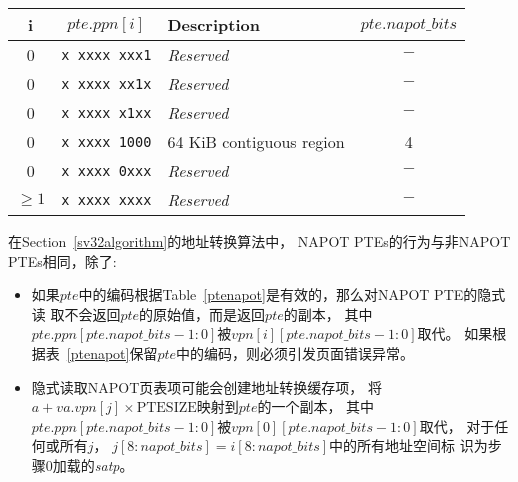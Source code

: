 \begin{table*}[h!]
\begin{center}
\begin{tabular}{|c|c||l|c|}
\hline
i        & $pte.ppn[i]$      & Description              & $pte.napot\_bits$ \\
\hline
0        & {\tt x~xxxx~xxx1} & {\em Reserved}           & $-$ \\
0        & {\tt x~xxxx~xx1x} & {\em Reserved}           & $-$ \\
0        & {\tt x~xxxx~x1xx} & {\em Reserved}           & $-$ \\
0        & {\tt x~xxxx~1000} & 64 KiB contiguous region & 4   \\
0        & {\tt x~xxxx~0xxx} & {\em Reserved}           & $-$ \\
$\geq 1$ & {\tt x~xxxx~xxxx} & {\em Reserved}           & $-$ \\
\hline
\end{tabular}
\end{center}
\caption{Page table entry encodings when $pte$.N=1}
\label{ptenapot}
\end{table*}

在Section~\ref{sv32algorithm}的地址转换算法中，
NAPOT PTEs的行为与非NAPOT PTEs相同，除了:
\begin{itemize}
  \item 如果$pte$中的编码根据Table~\ref{ptenapot}是有效的，那么对NAPOT PTE的隐式读
  取不会返回$pte$的原始值，而是返回$pte$的副本，
  其中$pte.ppn[pte.napot\_bits-1:0]$被$vpn[i][pte.napot\_bits-1:0]$取代。
  如果根据表~\ref{ptenapot}保留$pte$中的编码，则必须引发页面错误异常。
  \item 隐式读取NAPOT页表项可能会创建地址转换缓存项，
  将$a + va.vpn[j] \times \textrm{PTESIZE}$映射到$pte$的一个副本，
  其中$pte.ppn[pte.napot\_bits-1:0]$被$vpn[0][pte.napot\_bits-1:0]$取代，
  对于任何或所有$j$， ${j[8:napot\_bits]}={i[8:napot\_bits]}$中的所有地址空间标
  识为步骤0加载的{\em satp}。
\end{itemize}

